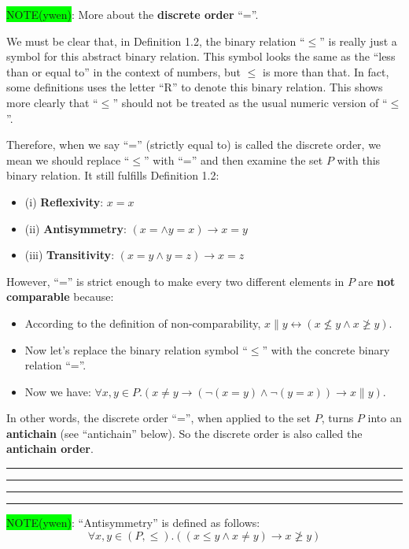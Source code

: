 \documentclass[12pt, letterpaper, oneside]{book}
\begin{document}
\colorbox{lime}{NOTE(ywen)}: More about the \textbf{discrete order} ``=''.

We must be clear that, in Definition 1.2, the binary relation ``$\leqslant$'' is really just a symbol for this abstract
binary relation. This symbol looks the same as the ``less than or equal to'' in the context of numbers, but $\leqslant$
is more than that. In fact, some definitions uses the letter ``R'' to denote this binary relation. This shows more
clearly that ``$\leqslant$'' should not be treated as the usual numeric version of ``$\leqslant$''.

Therefore, when we say ``='' (strictly equal to) is called the discrete order, we mean we should replace ``$\leqslant$''
with ``='' and then examine the set $P$ with this binary relation. It still fulfills Definition 1.2:
\begin{itemize}
  \item (i) \textbf{Reflexivity}: $x = x$
  \item (ii) \textbf{Antisymmetry}: $(x = \land y = x) \rightarrow x = y$
  \item (iii) \textbf{Transitivity}: $(x = y \land y = z) \rightarrow x = z$
\end{itemize}

However, ``='' is strict enough to make every two different elements in $P$ are \textbf{not comparable} because:
\begin{itemize}
  \item According to the definition of non-comparability, $x \parallel y \leftrightarrow (x \nleqslant y \land x \ngeqslant y)$.
  \item Now let's replace the binary relation symbol ``$\leqslant$'' with the concrete binary relation ``=''.
  \item Now we have: $\forall x, y \in P. (x \ne y \rightarrow (\lnot (x = y) \land \lnot (y = x)) \rightarrow x \parallel y)$.
\end{itemize}

In other words, the discrete order ``='', when applied to the set $P$, turns $P$ into an \textbf{antichain} (see
``antichain'' below). So the discrete order is also called the \textbf{antichain order}.

\noindent\rule{10cm}{0.4pt}\rule{1cm}{10pt}

\noindent\rule[-9pt]{1cm}{10pt}\rule{10cm}{0.4pt}

\colorbox{lime}{NOTE(ywen)}: ``Antisymmetry'' is defined as follows:
\[ \forall x, y \in (P, \leqslant). ((x \leqslant y \land x \ne y) \rightarrow x \ngeqslant y) \]
\end{document}
